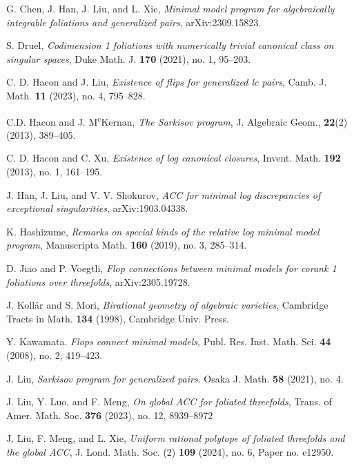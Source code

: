 \documentclass[preprint,12pt]{elsarticle}
\begin{document}
\begin{thebibliography}{00}
 G. Chen, J. Han, J. Liu, and L. Xie, \textit{Minimal model program for algebraically integrable foliations and generalized pairs}, arXiv:2309.15823. 


 S. Druel, \textit{Codimension 1 foliations with numerically trivial canonical class on singular spaces}, Duke Math. J. \textbf{170} (2021), no. 1, 95--203.

 C. D. Hacon and J. Liu, \textit{Existence of flips for generalized lc pairs}, Camb. J. Math. \textbf{11} (2023), no. 4, 795--828.  

 C.D. Hacon and J. M\textsuperscript{c}Kernan, \textit{The Sarkisov program}, J. Algebraic Geom., \textbf{22}(2) (2013), 389--405.

 C. D. Hacon and C. Xu, \textit{Existence of log canonical closures}, Invent. Math. \textbf{192} (2013), no. 1, 161--195.


 J. Han, J. Liu, and V. V. Shokurov, \textit{ACC for minimal log discrepancies of exceptional singularities}, arXiv:1903.04338.

 K. Hashizume, \textit{Remarks on special kinds of the relative log minimal model program}, Manuscripta Math. \textbf{160} (2019), no. 3, 285--314.

 D. Jiao and P. Voegtli, \textit{Flop connections between minimal models for
corank 1 foliations over threefolds}, arXiv:2305.19728.


 J. Koll\'{a}r and S. Mori, \textit{Birational geometry of algebraic varieties}, Cambridge Tracts in Math. \textbf{134} (1998), Cambridge Univ. Press.

 Y. Kawamata. \textit{Flops connect minimal models}, Publ. Res. Inst. Math. Sci. \textbf{44} (2008), no. 2, 419--423. 

 J. Liu, \textit{Sarkisov program for generalized pairs}.  Osaka J. Math. \textbf{58} (2021), no. 4.

 J. Liu, Y. Luo, and F. Meng, \textit{On global ACC for foliated threefolds},  Trans. of Amer. Math. Soc. \textbf{376} (2023), no. 12, 8939--8972

 J. Liu, F. Meng, and L. Xie, \textit{Uniform rational polytope of foliated threefolds and the global ACC}, J. Lond. Math. Soc. (2) \textbf{109} (2024), no. 6, Paper no. e12950.


\end{thebibliography}
\end{document}
